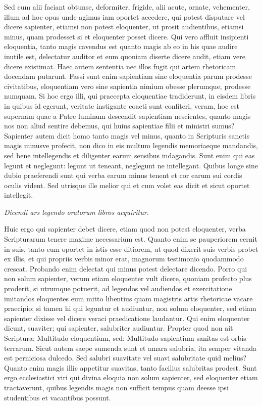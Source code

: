 Sed cum alii faciant obtunse, deformiter, frigide, alii acute, ornate, vehementer, illum ad hoc opus unde agimus iam oportet accedere, qui potest disputare vel dicere sapienter, etiamsi non potest eloquenter, ut prosit audientibus, etiamsi minus, quam prodesset si et eloquenter posset dicere. Qui vero affluit insipienti eloquentia, tanto magis cavendus est quanto magis ab eo in his quae audire inutile est, delectatur auditor et eum quoniam diserte dicere audit, etiam vere dicere existimat. Haec autem sententia nec illos fugit qui artem rhetoricam docendam putarunt. Fassi sunt enim sapientiam sine eloquentia parum prodesse civitatibus, eloquentiam vero sine sapientia nimium obesse plerumque, prodesse numquam. Si hoc ergo illi, qui praecepta eloquentiae tradiderunt, in eisdem libris in quibus id egerunt, veritate instigante coacti sunt confiteri, veram, hoc est supernam quae a Patre luminum descendit sapientiam nescientes, quanto magis nos non aliud sentire debemus, qui huius sapientiae filii et ministri sumus? Sapienter autem dicit homo tanto magis vel minus, quanto in Scripturis sanctis magis minusve profecit, non dico in eis multum legendis memoriaeque mandandis, sed bene intellegendis et diligenter earum sensibus indagandis. Sunt enim qui eas legunt et neglegunt: legunt ut teneant, neglegunt ne intellegant. Quibus longe sine dubio praeferendi sunt qui verba earum minus tenent et cor earum sui cordis oculis vident. Sed utrisque ille melior qui et cum volet eas dicit et sicut oportet intellegit.

\textit{Dicendi ars legendo oratorum libros acquiritur.}

Huic ergo qui sapienter debet dicere, etiam quod non potest eloquenter, verba Scripturarum tenere maxime necessarium est. Quanto enim se pauperiorem cernit in suis, tanto eum oportet in istis esse ditiorem, ut quod dixerit suis verbis probet ex illis, et qui propriis verbis minor erat, magnorum testimonio quodammodo crescat. Probando enim delectat qui minus potest delectare dicendo. Porro qui non solum sapienter, verum etiam eloquenter vult dicere, quoniam profecto plus proderit, si utrumque potuerit, ad legendos vel audiendos et exercitatione imitandos eloquentes eum mitto libentius quam magistris artis rhetoricae vacare praecipio; si tamen hi qui leguntur et audiuntur, non solum eloquenter, sed etiam sapienter dixisse vel dicere veraci praedicatione laudantur. Qui enim eloquenter dicunt, suaviter; qui sapienter, salubriter audiuntur. Propter quod non ait Scriptura: Multitudo eloquentium, sed: Multitudo sapientium sanitas est orbis terrarum. Sicut autem saepe sumenda sunt et amara salubria, ita semper vitanda est perniciosa dulcedo. Sed salubri suavitate vel suavi salubritate quid melius? Quanto enim magis illic appetitur suavitas, tanto facilius salubritas prodest. Sunt ergo ecclesiastici viri qui divina eloquia non solum sapienter, sed eloquenter etiam tractaverunt, quibus legendis magis non sufficit tempus quam deesse ipsi studentibus et vacantibus possunt.

